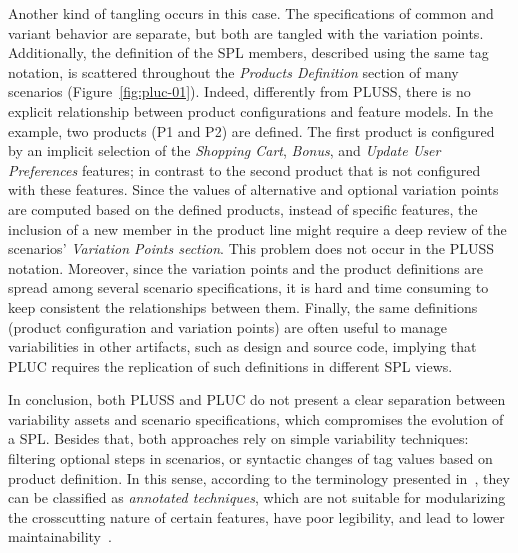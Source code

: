 \documentclass{sig-alternate}
\begin{document}
Another kind of tangling occurs in this case. The specifications of common and
variant behavior are separate, but both are tangled with the variation points.
Additionally, the definition of the SPL members, described using the
same tag notation, is scattered throughout the \emph{Products
Definition} section of many scenarios (Figure~\ref{fig:pluc-01}).
Indeed, differently from PLUSS, there is no explicit
relationship between product configurations and feature models. In the example, two products (P1 and P2) are defined. The first product is configured by an implicit selection of the \emph{Shopping Cart}, \emph{Bonus}, and \emph{Update
User Preferences} features; in contrast to the second product that is not
configured with these features. Since the values of alternative and optional
variation points are computed based on the defined products, instead of specific
features, the inclusion of a new member in the product line might require a deep
review of the scenarios' \emph{Variation Points section}. This problem does not 
occur in the PLUSS notation. Moreover, since the
variation points and the product definitions are spread among several scenario
specifications, it is hard and time consuming to keep consistent the
relationships between them. Finally, the same definitions (product configuration
and variation points) are often useful to manage variabilities in other
artifacts, such as design and source code, implying that PLUC
requires the replication of such definitions in different SPL views.

In conclusion, both PLUSS and PLUC do not present a clear separation between
variability assets and scenario specifications, which compromises the
evolution of a SPL. Besides that, both approaches rely on simple
variability techniques: filtering optional steps in scenarios, or syntactic
changes of tag values based on product definition. In this sense, according to the terminology
presented in~\cite{Kastner:2008aa}, they can be classified as \emph{annotated
techniques}, which are not suitable for modularizing the crosscutting nature of certain
features, have poor legibility, and lead to lower
maintainability~\cite{Alves:2006aa,Kastner:2008aa}.

\end{document}
